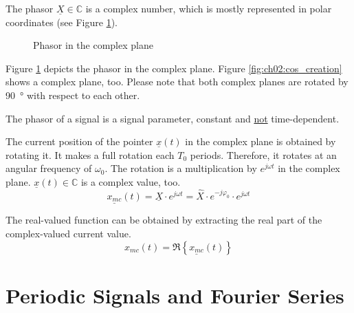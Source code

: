 \begin{refsection}
The phasor $\underline{X} \in \mathbb{C}$ is a complex number, which is mostly represented in polar coordinates (see Figure \ref{fig:ch02:cmplxplane_phasor}).

\begin{figure}[H]
	\centering
	\caption{Phasor in the complex plane}
	\label{fig:ch02:cmplxplane_phasor}
\end{figure}

Figure \ref{fig:ch02:cmplxplane_phasor} depicts the phasor in the complex plane. Figure \ref{fig:ch02:cos_creation} shows a complex plane, too. Please note that both complex planes are rotated by \SI{90}{\degree} with respect to each other.

\begin{fact}
	The phasor of a signal is a signal parameter, constant and \underline{not} time-dependent.
\end{fact}

The current position of the pointer $\underline{x}(t)$ in the complex plane is obtained by rotating it. It makes a full rotation each $T_0$ periods. Therefore, it rotates at an angular frequency of $\omega_0$. The rotation is a multiplication by $e^{j \omega t}$ in the complex plane. $\underline{x}(t) \in \mathbb{C}$ is a complex value, too.
\begin{equation}
	\underline{x_{mc}}(t) = \underline{X} \cdot e^{j \omega t} = \hat{X} \cdot e^{-j \varphi_0} \cdot e^{j \omega t}
\end{equation}


The real-valued function can be obtained by extracting the real part of the complex-valued current value.
\begin{equation}
	x_{mc}(t) = \Re\left\{\underline{x_{mc}}(t)\right\}
\end{equation}

\section{Periodic Signals and Fourier Series}


\end{refsection}
